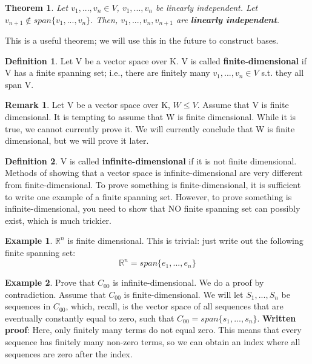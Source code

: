 \documentclass[a4paper, 12pt]{article}
\newtheorem{theorem}{Theorem}
\theoremstyle{definition}
\newtheorem{exmp}{Example}[section]
\theoremstyle{definition}
\newtheorem{defn}{Definition}[section]
\theoremstyle{definition}
\theoremstyle{definition}
\newtheorem{rmk}{Remark}[section]
\begin{document}
{\begin{theorem}
	Let $v_1,...,v_n \in V$, $v_1,...,v_n$ be linearly independent. Let $v_{n+1} \notin span \{v_1,...,v_n \}$. Then, $v_1,...,v_n, v_{n+1}$ are \textbf{linearly independent}. 
\end{theorem}
This is a useful theorem; we will use this in the future to construct bases. 

\begin{defn}
	Let V be a vector space over K. V is called \textbf{finite-dimensional} if V has a finite spanning set; i.e., there are finitely many $v_1,...,v_n \in V$ s.t. they all span V. 
\end{defn}
\begin{rmk}
	Let V be a vector space over K, $W \leq V$. Assume that V is finite dimensional. It is tempting to assume that W is finite dimensional. While it is true, we cannot currently prove it. We will currently conclude that W is finite dimensional, but we will prove it later.  
\end{rmk}

\begin{defn}
	V is called \textbf{infinite-dimensional} if it is not finite dimensional. Methods of showing that a vector space is infinite-dimensional are very different from finite-dimensional. To prove something is finite-dimensional, it is sufficient to write one example of a finite spanning set. However, to prove something is infinite-dimensional, you need to show that NO finite spanning set can possibly exist, which is much trickier. 
\end{defn}

\begin{exmp}
	$\mathbb{R}^n$ is finite dimensional. This is trivial: just write out the following finite spanning set:
	$$ \mathbb{R}^n = span \{ e_1, ..., e_n \} $$
\end{exmp}

\begin{exmp}
	Prove that $C_{00}$ is infinite-dimensional. We do a proof by contradiction. 
	\newline 
	\newline
	Assume that $C_{00}$ is finite-dimensional. We will let $S_1,...,S_n$ be sequences in $C_{00}$, which, recall, is the vector space of all sequences that are eventually constantly equal to zero, such that $C_{00} = span \{ s_1,...,s_n \}$. 
	\newline 
	\textbf{Written proof}: 
	\newline
	Here, only finitely many terms do not equal zero. This means that every sequence has finitely many non-zero terms, so we can obtain an index where all sequences are zero after the index. 
\end{exmp}

}
\end{document}
